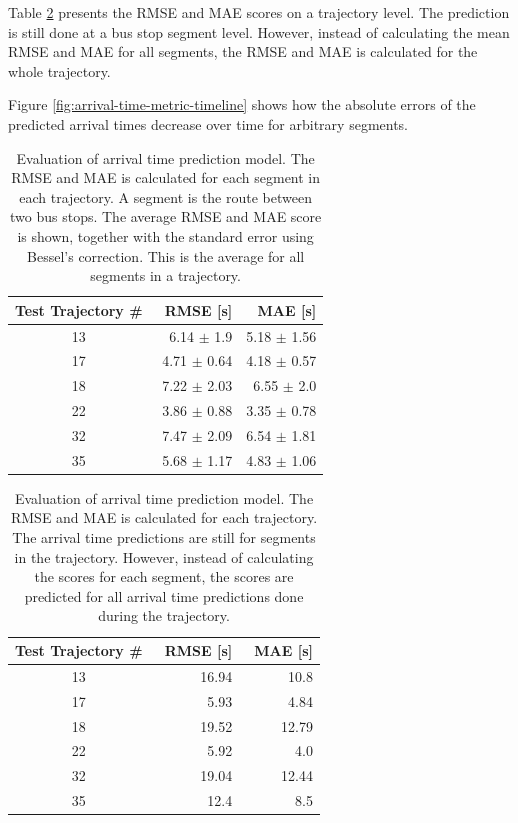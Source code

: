 Table \ref{tab:arrival-time-metrics} presents the RMSE and MAE scores on a trajectory level.
The prediction is still done at a bus stop segment level.
However, instead of calculating the mean RMSE and MAE for all segments, the RMSE and MAE is calculated for the whole trajectory.

Figure \ref{fig:arrival-time-metric-timeline} shows how the absolute errors of the predicted arrival times decrease over time for arbitrary segments.

\begin{table}[h!]
    \centering
    \caption[ Evaluation of arrival time prediction model ]%
    {{\small Evaluation of arrival time prediction model.
    The RMSE and MAE is calculated for each segment in each trajectory.
    A segment is the route between two bus stops.
    The average RMSE and MAE score is shown, together with the standard error using Bessel's correction.
    This is the average for all segments in a trajectory.}}
    \label{tab:arrival-time-eval-metrics} 
    \begin{tabular}{ |c|r|r| }
        \hline
        Test Trajectory \# & RMSE [s] & MAE [s] \\
        \hline
        13 & 6.14 $\pm$ 1.9 & 5.18 $\pm$ 1.56\\
        17 & 4.71 $\pm$ 0.64 & 4.18 $\pm$ 0.57 \\
        18 & 7.22 $\pm$ 2.03 & 6.55 $\pm$ 2.0 \\
        22 & 3.86 $\pm$ 0.88 & 3.35 $\pm$ 0.78 \\
        32 & 7.47 $\pm$ 2.09 & 6.54 $\pm$ 1.81 \\
        35 & 5.68 $\pm$ 1.17 & 4.83 $\pm$ 1.06 \\
        \hline
    \end{tabular}
\end{table}

\begin{table}[h!]
    \centering
    \caption[ Evaluation of arrival time prediction model ]%
    {{\small Evaluation of arrival time prediction model.
    The RMSE and MAE is calculated for each trajectory.
    The arrival time predictions are still for segments in the trajectory.
    However, instead of calculating the scores for each segment, the scores are predicted for all arrival time predictions done during the trajectory.}}
    \label{tab:arrival-time-metrics} 
    \begin{tabular}{ |c|r|r| }
        \hline
        Test Trajectory \# & RMSE [s] & MAE [s] \\
        \hline
        13 & 16.94 & 10.8 \\
        17 & 5.93 & 4.84 \\
        18 & 19.52 & 12.79 \\
        22 & 5.92 & 4.0 \\
        32 & 19.04 & 12.44 \\
        35 & 12.4 & 8.5 \\
        \hline
    \end{tabular}
\end{table}

